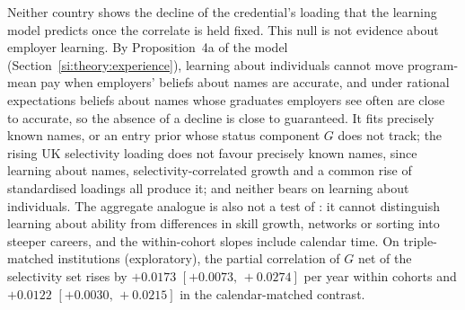 \documentclass[11pt]{article}
\newcommand{\ci}[2]{$[#1,\allowbreak\,#2]$}
\begin{document}
Neither country shows the decline of the credential's loading that the learning model predicts once the correlate
is held fixed. This null is not evidence about employer learning. By Proposition~4a of the model
(Section~\ref{si:theory:experience}), learning about individuals cannot move program-mean pay when employers' beliefs
about names are accurate, and under rational expectations beliefs about names whose graduates employers see often
are close to accurate, so the absence of a decline is close to guaranteed. It fits precisely known names, or an
entry prior whose status component $G$ does not track; the rising UK selectivity loading does not favour precisely
known names, since learning about names, selectivity-correlated growth and a common rise of standardised loadings
all produce it; and neither bears on learning about individuals. The aggregate analogue is also not a test of
\citet{arcidiacono2010beyond}: it cannot distinguish learning about ability from differences in skill growth,
networks or sorting into steeper careers, and the within-cohort slopes include calendar time. On triple-matched institutions (exploratory),
the partial correlation of $G$ net of the selectivity set rises by $+0.0173$ \ci{+0.0073}{+0.0274} per year within
cohorts and $+0.0122$ \ci{+0.0030}{+0.0215} in the calendar-matched contrast.
\end{document}
